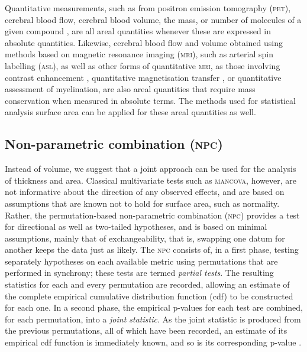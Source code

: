 Quantitative measurements, such as from positron emission tomography (\textsc{pet}), cerebral blood flow, cerebral blood volume, the mass, or number of molecules of a given compound \citep{Leahy2000, VandenHoff2005}, are all areal quantities whenever these are expressed in absolute quantities. Likewise, cerebral blood flow and volume obtained using methods based on magnetic resonance imaging (\textsc{mri}), such as arterial spin labelling (\textsc{asl}), as well as other forms of quantitative \textsc{mri}, as those involving contrast enhancement \citep{Parker2003}, quantitative magnetisation transfer \citep{Levesque2010, Harrison2015}, or quantitative assessment of myelination, are also areal quantities that require mass conservation when measured in absolute terms. The methods used for statistical analysis surface area can be applied for these areal quantities as well.

\subsection{Non-parametric combination (\textsc{npc})}

Instead of volume, we suggest that a joint approach can be used for the analysis of thickness and area. Classical multivariate tests such as \textsc{mancova}, however, are not informative about the direction of any observed effects, and are based on assumptions that are known not to hold for surface area, such as normality. Rather, the permutation-based non-parametric combination (\textsc{npc}) \citep{Pesarin2010, Winkler2016_npc} provides a test for directional as well as two-tailed hypotheses, and is based on minimal assumptions, mainly that of exchangeability, that is, swapping one datum for another keeps the data just as likely. The \textsc{npc} consists of, in a first phase, testing separately hypotheses on each available metric using permutations that are performed in synchrony; these tests are termed \emph{partial tests}. The resulting statistics for each and every permutation are recorded, allowing an estimate of the complete empirical cumulative distribution function (cdf) to be constructed for each one. In a second phase, the empirical p-values for each test are combined, for each permutation, into a \emph{joint statistic}. As the joint statistic is produced from the previous permutations, all of which have been recorded, an estimate of its empirical cdf function is immediately known, and so is its corresponding p-value \citep{Pesarin2010}.

